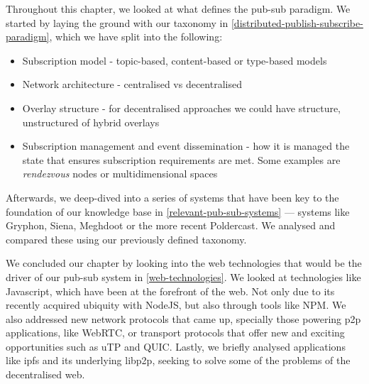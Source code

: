 Throughout this chapter, we looked at what defines the pub-sub paradigm. We
started by laying the ground with our taxonomy in
\ref{distributed-publish-subscribe-paradigm}, which we have split into the
following:

\begin{itemize}
  \item
    Subscription model - topic-based, content-based or type-based models
  \item
    Network architecture - centralised vs decentralised
  \item
    Overlay structure - for decentralised approaches we could have structure,
    unstructured of hybrid overlays
  \item
    Subscription management and event dissemination - how it is managed the state that ensures subscription requirements are met. Some examples are \emph{rendezvous} nodes or multidimensional spaces
\end{itemize}


Afterwards, we deep-dived into a series of systems that have been key to the
foundation of our knowledge base in \ref{relevant-pub-sub-systems} — systems
like Gryphon, Siena, Meghdoot or the more recent Poldercast. We analysed and
compared these using our previously defined taxonomy.

We concluded our chapter by looking into the web technologies that would be the
driver of our pub-sub system in \ref{web-technologies}. We looked at
technologies like Javascript, which have been at the forefront of the web. Not
only due to its recently acquired ubiquity with NodeJS, but also through tools
like NPM. We also addressed new network protocols that came up, specially those
powering \acrshort{p2p} applications, like WebRTC, or transport protocols that
offer new and exciting opportunities such as uTP and QUIC. Lastly, we briefly
analysed applications like \acrshort{ipfs} and its underlying libp2p, seeking
to solve some of the problems of the decentralised web.
